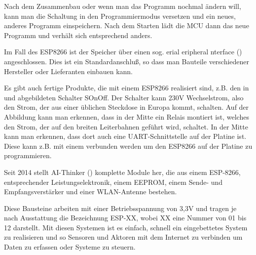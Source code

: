 Nach dem Zusammenbau oder wenn man das Programm nochmal ändern will, kann man die Schaltung in den Programmiermodus versetzen und ein neues, anderes Programm 
einspeichern. Nach dem Starten lädt die MCU dann das neue Programm und verhält sich entsprechend anders.

Im Fall des ESP8266 ist der Speicher über einen sog. erial eripheral nterface  () angeschlossen.
Dies ist ein Standardanschluß, so dass man Bauteile verschiedener Hersteller oder Lieferanten einbauen kann.



Es gibt auch fertige Produkte, die mit einem ESP8266 realisiert sind, z.B. den in  und  abgebildeten Schalter SOnOff. 
Der Schalter kann 230V Wechselstrom, also den Strom, der aus einer üblichen Steckdose in Europa kommt, schalten. Auf der Abbildung kann man erkennen, 
dass in der Mitte ein Relais montiert ist, welches den Strom, der auf den breiten Leiterbahnen geführt wird, schaltet. In der Mitte kann man erkennen, 
dass dort auch eine UART-Schnittstelle auf der Platine ist. 
Diese kann z.B. mit einem  verbunden werden um den ESP8266 auf der Platine zu programmieren.




Seit 2014 stellt AI-Thinker () komplette Module her, die aus einem ESP-8266, entsprechender Leistungselektronik, einem EEPROM, einem Sende- und Empfangsverstärker und einer WLAN-Antenne bestehen. 

Diese Bausteine arbeiten mit einer Betriebsspannung von 3,3V und tragen je nach Ausstattung die Bezeichnung ESP-XX, wobei XX eine Nummer von 01 bis 12 darstellt.
Mit diesen Systemen ist es einfach, schnell ein eingebettetes System zu realisieren und so Sensoren und Aktoren mit dem Internet zu verbinden um 
Daten zu erfassen oder Systeme zu steuern.


